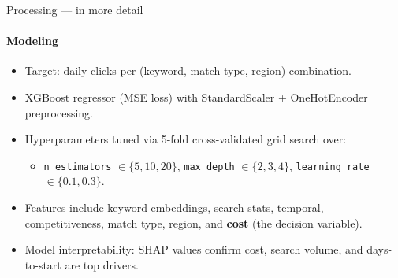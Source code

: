 \documentclass[smaller]{beamer}
\begin{document}
\begin{frame}{Processing --- in more detail}
\framesubtitle{Modeling}
\begin{itemize}
    \item Target: daily clicks per (keyword, match type, region) combination.
    \item XGBoost regressor (MSE loss) with StandardScaler + OneHotEncoder preprocessing.
    \item Hyperparameters tuned via 5-fold cross-validated grid search over:
    \begin{itemize}
        \item \texttt{n\_estimators} $\in \{5, 10, 20\}$,\; \texttt{max\_depth} $\in \{2, 3, 4\}$,\; \texttt{learning\_rate} $\in \{0.1, 0.3\}$.
    \end{itemize}
    \item Features include keyword embeddings, search stats, temporal, competitiveness, match type, region, and \textbf{cost} (the decision variable).
    \item Model interpretability: SHAP values confirm cost, search volume, and days-to-start are top drivers.
\end{itemize}
\end{frame}
\end{document}
